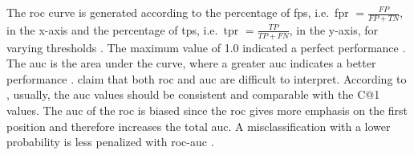 The \ac{roc} curve is generated according to the percentage of \acp{fp}, i.e.\ \ac{fpr} $= \frac{FP}{FP+TN}$, in the x-axis and 
the percentage of \acp{tp}, i.e.\ \ac{tpr} $=\frac{TP}{TP+FN}$, in the y-axis,
for varying thresholds \citep{kocher_unine_2015,neal_surveying_2018}.
The maximum value of 1.0 indicated a perfect performance \citep{kocher_unine_2015}.
The \ac{auc} is the area under the curve, where a greater \ac{auc} indicates a better performance \citep{neal_surveying_2018}.
\citet{kocher_unine_2015} claim that both \ac{roc} and \ac{auc} are difficult to interpret.
According to \citet{kocher_unine_2015}, usually, the \ac{auc} values should be consistent and comparable with the C@1 values.
The \ac{auc} of the \ac{roc} is biased since the \ac{roc} gives more emphasis 
on the first position and therefore increases the total \ac{auc}.
A misclassification with a lower probability is less penalized with \ac{roc-auc} \citep{kocher_unine_2015}.